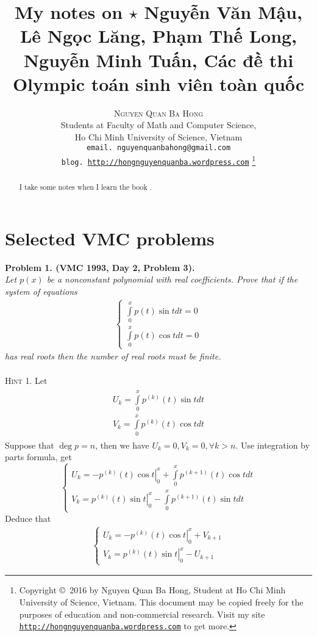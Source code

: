 \documentclass{article}
\title{My notes on $\star$ \foreignlanguage{vietnamese}{Nguyễn Văn Mậu, Lê Ngọc Lăng, Phạm Thế Long, Nguyễn Minh Tuấn, Các đề thi Olympic toán sinh viên toàn quốc}}
\author{\textsc{Nguyen Quan Ba Hong}\\
{\small Students at Faculty of Math and Computer Science,}\\ 
{\small Ho Chi Minh University of Science, Vietnam} \\
{\small \texttt{email. nguyenquanbahong@gmail.com}}\\
{\small \texttt{blog. \url{http://hongnguyenquanba.wordpress.com}} 
\footnote{Copyright \copyright\ 2016 by Nguyen Quan Ba Hong, Student at Ho Chi Minh University of Science, Vietnam. This document may be copied freely for the purposes of education and non-commercial research. Visit my site \texttt{\url{http://hongnguyenquanba.wordpress.com}} to get more.}}}
\numberwithin{equation}{section}
\begin{document}
\maketitle
\begin{abstract}
I take some notes when I learn the book \cite{1}.
\end{abstract}
\newpage
\tableofcontents
\newpage
\section{Selected VMC problems}
\textbf{Problem 1. (VMC 1993, Day 2, Problem 3).} \\
\textit{Let $p(x)$ be a nonconstant polynomial with real coefficients. Prove that if the system of equations
\begin{align}
\left\{ {\begin{array}{*{20}{c}}
{\int\limits_0^x {p\left( t \right)\sin tdt = 0} }\\
{\int\limits_0^x {p\left( t \right)\cos tdt = 0} }
\end{array}} \right.
\end{align}
has real roots then the number of real roots must be finite.}\\\\
\textsc{Hint 1.} Let 
\begin{align}
\begin{array}{l}
{U_k} = \int\limits_0^x {{p^{\left( k \right)}}\left( t \right)\sin t} dt\\
{V_k} = \int\limits_0^x {{p^{\left( k \right)}}\left( t \right)\cos t} dt
\end{array}
\end{align}
Suppose that $\deg p=n$, then we have ${U_k} = 0,{V_k} = 0,\forall k > n$. Use integration by parts formula, get
\begin{equation}
\label{2.1}
\left\{ \begin{array}{l}
{U_k} = \left. { - {p^{\left( k \right)}}\left( t \right)\cos t} \right|_0^x + \int\limits_0^x {{p^{\left( {k + 1} \right)}}\left( t \right)\cos t} dt\\
{V_k} = \left. {{p^{\left( k \right)}}\left( t \right)\sin t} \right|_0^x - \int\limits_0^x {{p^{\left( {k + 1} \right)}}\left( t \right)\sin t} dt
\end{array} \right.
\end{equation}
Deduce that
\begin{align}
\left\{ \begin{array}{l}
{U_k} = \left. { - {p^{\left( k \right)}}\left( t \right)\cos t} \right|_0^x + {V_{k + 1}}\\
{V_k} = \left. {{p^{\left( k \right)}}\left( t \right)\sin t} \right|_0^x - {U_{k + 1}}
\end{array} \right.
\end{align}
\end{document}
